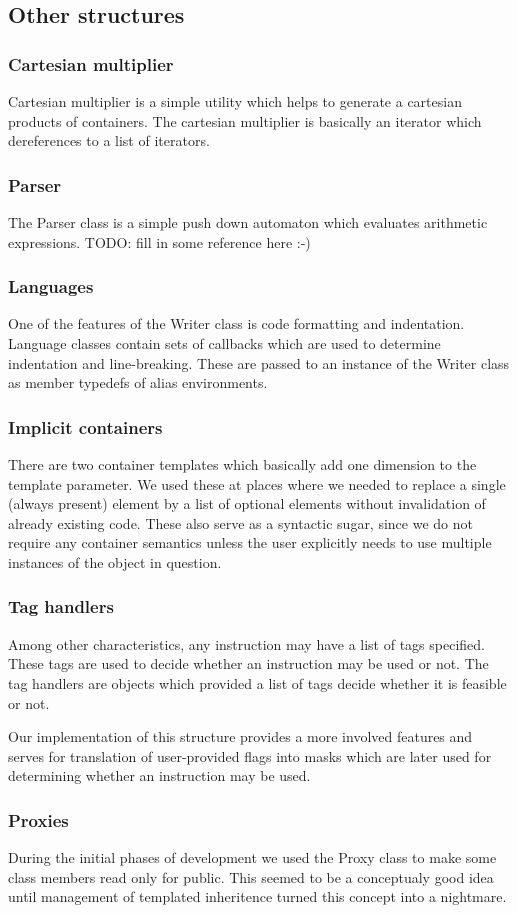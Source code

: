 \subsection{Other structures}

\subsubsection{Cartesian multiplier}
   Cartesian multiplier is a simple utility which helps to generate a cartesian products of containers. The cartesian multiplier is basically an iterator which dereferences to a list of iterators.

\subsubsection{Parser}
  The Parser class is a simple push down automaton which evaluates arithmetic expressions. TODO: fill in some reference here :-)

\subsubsection{Languages}
  One of the features of the Writer class is code formatting and indentation. Language classes contain sets of callbacks which are used to determine indentation and line-breaking. These are passed to an instance of the Writer class as member typedefs of alias environments.

\subsubsection{Implicit containers}
  There are two container templates which basically add one dimension to the template parameter. We used these at places where we needed to replace a single (always present) element by a list of optional elements without invalidation of already existing code. These also serve as a syntactic sugar, since we do not require any container semantics unless the user explicitly needs to use multiple instances of the object in question.

\subsubsection{Tag handlers}
  Among other characteristics, any instruction may have a list of tags specified. These tags are used to decide whether an instruction may be used or not. The tag handlers are objects which provided a list of tags decide whether it is feasible or not. 

  
  Our implementation of this structure provides a more involved features and serves for translation of user-provided flags into masks which are later used for determining whether an instruction may be used.

\subsubsection{Proxies}
  During the initial phases of development we used the Proxy class to make some class members read only for public. This seemed to be a conceptualy good idea until management of templated inheritence turned this concept into a nightmare. 

